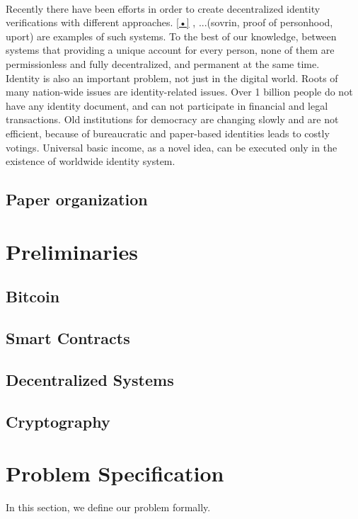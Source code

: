 \documentclass[conference]{IEEEtran}
\begin{document}
\\
Recently there have been efforts in order to create decentralized identity verifications with different approaches.  \ref{•} , ...(sovrin, proof of personhood, uport) are examples of such systems. To the best of our knowledge, between systems that providing a unique account for every person, none of them are permissionless and fully decentralized, and permanent at the same time.
\\
Identity is also an important problem, not just in the digital world. Roots of many nation-wide issues are identity-related issues. Over 1 billion people do not have any identity document, and can not participate in financial and legal transactions. Old institutions for democracy are changing slowly and are not efficient, because of bureaucratic and paper-based identities leads to costly votings. Universal basic income, as a novel idea, can be executed only in the existence of worldwide identity system.

\subsection{Paper organization}



\section{Preliminaries}
\subsection{Bitcoin}
\subsection{Smart Contracts}
\subsection{Decentralized Systems}
\subsection{Cryptography}


\section{ Problem Specification}
In this section, we define our problem formally.
\end{document}
